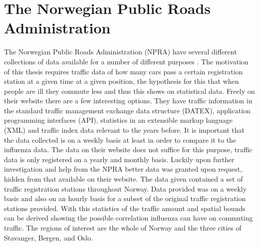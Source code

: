 \section{The Norwegian Public Roads Administration}
The Norwegian Public Roads Administration (NPRA) have several different collections of data available for a number of different purposes \cite{vegvesenet}. The motivation of this thesis requires traffic data of how many cars pass a certain registration station at a given time at a given position, the hypothesis for this that when people are ill they commute less and thus this shows on statistical data. Freely on their website \cite{vegvesenet} there are a few interesting options. They have traffic information in the standard traffic management exchange data structure (DATEX), application programming interfaces (API), statistics in an extensible markup language (XML) and traffic index data relevant to the years before. It is important that the data collected is on a weekly basis at least in order to compare it to the influenza data. The data on their website does not suffice for this purpose, traffic data is only registered on a yearly and monthly basis. Luckily upon further investigation and help from the NPRA better data was granted upon request, hidden from that available on their website. The data given contained a set of traffic registration stations throughout Norway. Data provided was on a weekly basis and also on an hourly basis for a subset of the original traffic registration stations provided. With this statistics of the traffic amount and spatial bounds can be derived showing the possible correlation influenza can have on commuting traffic. The regions of interest are the whole of Norway and the three cities of Stavanger, Bergen, and Oslo.

